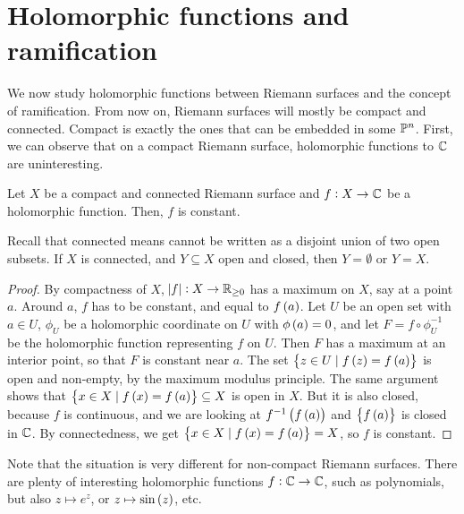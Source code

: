 \pagebreak

\section{Holomorphic functions and ramification}


We now study holomorphic functions between Riemann surfaces and the concept of ramification. From now on, Riemann surfaces will mostly be compact and connected. Compact is exactly the ones that can be embedded in some $ \P^n $. First, we can observe that on a compact Riemann surface, holomorphic functions to $ \C $ are uninteresting.

\begin{proposition}
Let $ X $ be a compact and connected Riemann surface and $ f : X \to \C $ be a holomorphic function. Then, $ f $ is constant.
\end{proposition}

Recall that connected means cannot be written as a disjoint union of two open subsets. If $ X $ is connected, and $ Y \subseteq X $ open and closed, then $ Y = \emptyset $ or $ Y = X $.

\begin{proof}
By compactness of $ X $, $ \abs{f} : X \to \R_{\ge 0} $ has a maximum on $ X $, say at a point $ a $. Around $ a $, $ f $ has to be constant, and equal to $ f\br{a} $. Let $ U $ be an open set with $ a \in U $, $ \phi_U $ be a holomorphic coordinate on $ U $ with $ \phi\br{a} = 0 $, and let $ F = f \circ \phi_U^{-1} $ be the holomorphic function representing $ f $ on $ U $. Then $ F $ has a maximum at an interior point, so that $ F $ is constant near $ a $. The set $ \cbr{z \in U \mid f\br{z} = f\br{a}} $ is open and non-empty, by the maximum modulus principle. The same argument shows that $ \cbr{x \in X \mid f\br{x} = f\br{a}} \subseteq X $ is open in $ X $. But it is also closed, because $ f $ is continuous, and we are looking at $ f^{-1}\br{f\br{a}} $ and $ \cbr{f\br{a}} $ is closed in $ \C $. By connectedness, we get $ \cbr{x \in X \mid f\br{x} = f\br{a}} = X $, so $ f $ is constant.
\end{proof}

\begin{remark}
Note that the situation is very different for non-compact Riemann surfaces. There are plenty of interesting holomorphic functions $ f : \C \to \C $, such as polynomials, but also $ z \mapsto e^z $, or $ z \mapsto \sin\br{z} $, etc.
\end{remark}

